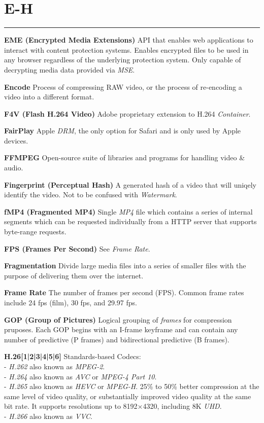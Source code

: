 \section{E-H}
\hrule

\medskip
\textbf{EME (Encrypted Media Extensions)}
API that enables web applications to interact with content protection systems. Enables encrypted files to be used in any browser regardless of the underlying protection system. Only capable of decrypting media data provided via \textit{MSE}.

\smallskip
\textbf{Encode}
Process of compressing RAW video, or the process of re-encoding a video into a different format.

\smallskip
\textbf{F4V (Flash H.264 Video)}
Adobe proprietary extension to H.264 \textit{Container}.

\smallskip
\textbf{FairPlay}
Apple \textit{DRM}, the only option for Safari and is only used by Apple devices.

\smallskip
\textbf{FFMPEG}
Open-source suite of libraries and programs for handling video \& audio.

\smallskip
\textbf{Fingerprint (Perceptual Hash)}
A generated hash of a video that will uniqely identify the video. Not to be confused with \textit{Watermark}.

\smallskip
\textbf{fMP4 (Fragmented MP4)}
Single \textit{MP4} file which contains a series of internal segments which can be requested individually from a HTTP server that supports byte-range requests.

\smallskip
\textbf{FPS (Frames Per Second)}
See \textit{Frame Rate}.

\smallskip
\textbf{Fragmentation}
Divide large media files into a series of smaller files with the purpose of delivering them over the internet.

\smallskip
\textbf{Frame Rate}
The number of frames per second (FPS). Common frame rates include 24 fps (film), 30 fps, and 29.97 fps.

\smallskip
\textbf{GOP (Group of Pictures)}
Logical grouping of \textit{frames} for compression pruposes. Each GOP begins with an I-frame keyframe and can contain any number of predictive (P frames) and bidirectional predictive (B frames).

\smallskip
\textbf{H.26[1|2|3|4|5|6]}
Standards-based Codecs:\\
 - \textit{H.262} also known as \textit{MPEG-2}.\\
 - \textit{H.264} also known as \textit{AVC} or  \textit{MPEG-4 Part 10}.\\
 - \textit{H.265} also known as \textit{HEVC} or \textit{MPEG-H}. 25\% to 50\% better compression at the same level of video quality, or substantially improved video quality at the same bit rate. It supports resolutions up to 8192×4320, including 8K \textit{UHD}.\\
 - \textit{H.266} also known as \textit{VVC}.

